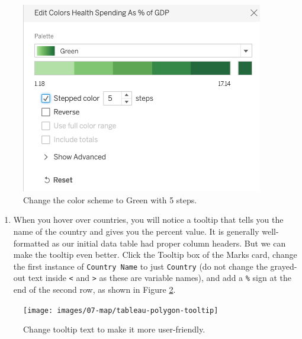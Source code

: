\documentclass[
  english,
]{book}
\providecommand{\tightlist}{%
  \setlength{\itemsep}{0pt}\setlength{\parskip}{0pt}}
\begin{document}
\begin{figure}
\includegraphics[width=400px]{images/07-map/tableau-polygon-color} \caption{Change the color scheme to Green with 5 steps.}\label{fig:tableau-polygon-color}
\end{figure}

\begin{enumerate}
\def\labelenumi{\arabic{enumi}.}
\setcounter{enumi}{7}
\tightlist
\item
  When you hover over countries, you will notice a tooltip that tells you the name of the country and gives you the percent value. It is generally well-formatted as our initial data table had proper column headers. But we can make the tooltip even better. Click the Tooltip box of the Marks card, change the first instance of \texttt{Country\ Name} to just \texttt{Country} (do not change the grayed-out text inside \texttt{\textless{}} and \texttt{\textgreater{}} as these are variable names), and add a \texttt{\%} sign at the end of the second row, as shown in Figure \ref{fig:tableau-polygon-tooltip}.
\end{enumerate}



\begin{figure}
\texttt{[image: images/07-map/tableau-polygon-tooltip]} \caption{Change tooltip text to make it more user-friendly.}\label{fig:tableau-polygon-tooltip}
\end{figure}
\end{document}
